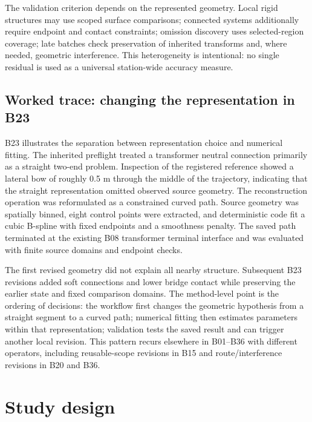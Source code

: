 \documentclass[10pt,a4paper]{article}
\begin{document}
The validation criterion depends on the represented geometry. Local
rigid structures may use scoped surface comparisons; connected systems
additionally require endpoint and contact constraints; omission
discovery uses selected-region coverage; late batches check preservation
of inherited transforms and, where needed, geometric interference. This
heterogeneity is intentional: no single residual is used as a universal
station-wide accuracy measure.

\hypertarget{worked-trace-changing-the-representation-in-b23}{%
\subsection{Worked trace: changing the representation in
B23}\label{worked-trace-changing-the-representation-in-b23}}

B23 illustrates the separation between representation choice and
numerical fitting. The inherited preflight treated a transformer neutral
connection primarily as a straight two-end problem. Inspection of the
registered reference showed a lateral bow of roughly 0.5 m through the
middle of the trajectory, indicating that the straight representation
omitted observed source geometry. The reconstruction operation was
reformulated as a constrained curved path. Source geometry was spatially
binned, eight control points were extracted, and deterministic code fit
a cubic B-spline with fixed endpoints and a smoothness penalty. The
saved path terminated at the existing B08 transformer terminal interface
and was evaluated with finite source domains and endpoint checks.

The first revised geometry did not explain all nearby structure.
Subsequent B23 revisions added soft connections and lower bridge contact
while preserving the earlier state and fixed comparison domains. The
method-level point is the ordering of decisions: the workflow first
changes the geometric hypothesis from a straight segment to a curved
path; numerical fitting then estimates parameters within that
representation; validation tests the saved result and can trigger
another local revision. This pattern recurs elsewhere in B01--B36 with
different operators, including reusable-scope revisions in B15 and
route/interference revisions in B20 and B36.

\hypertarget{study-design}{%
\section{Study design}\label{study-design}}
\end{document}
